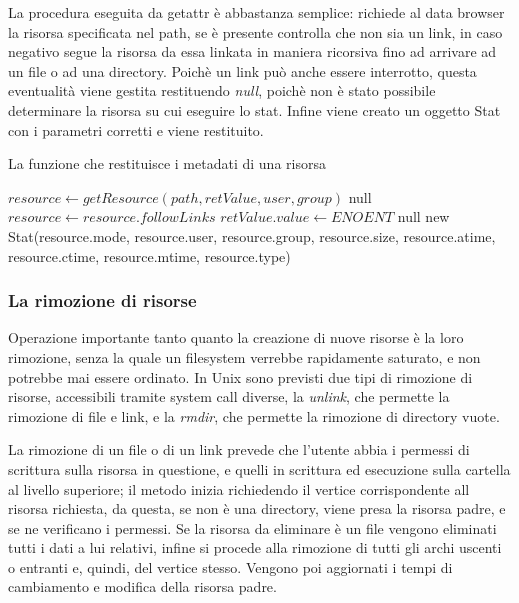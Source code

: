 La procedura eseguita da getattr è abbastanza semplice: richiede al data browser la risorsa specificata nel path, se è presente controlla che non sia un link, in caso negativo segue la risorsa da essa linkata in maniera ricorsiva fino ad arrivare ad un file o ad una directory. Poichè un link può anche essere interrotto, questa eventualità viene gestita restituendo \emph{null}, poichè non è stato possibile determinare la risorsa su cui eseguire lo stat. Infine viene creato un oggetto Stat con i parametri corretti e viene restituito.
\begin{algorithm}
\begin{algorithmic}[5]
\caption{La funzione che restituisce i metadati di una risorsa}
	\State $resource \gets getResource(path, retValue, user, group)$
		\State \Return null
	\EndIf
		\State $resource \gets resource.followLinks$
	\EndIf
		\State $retValue.value \gets ENOENT$
		\State \Return null
	\EndIf
	\State \Return new Stat(resource.mode, resource.user, resource.group, resource.size, resource.atime, resource.ctime, resource.mtime, resource.type)
\EndFunction
\end{algorithmic}
\end{algorithm}

\subsubsection{La rimozione di risorse}
Operazione importante tanto quanto la creazione di nuove risorse è la loro rimozione, senza la quale un filesystem verrebbe rapidamente saturato, e non potrebbe mai essere ordinato. In Unix sono previsti due tipi di rimozione di risorse, accessibili tramite system call diverse, la \emph{unlink}, che permette la rimozione di file e link, e la \emph{rmdir}, che permette la rimozione di directory vuote. 

La rimozione di un file o di un link prevede che l'utente abbia i permessi di scrittura sulla risorsa in questione, e quelli in scrittura ed esecuzione sulla cartella al livello superiore; il metodo inizia richiedendo il vertice corrispondente all risorsa richiesta, da questa, se non è una directory, viene presa la risorsa padre, e se ne verificano i permessi. Se la risorsa da eliminare è un file vengono eliminati tutti i dati a lui relativi, infine si procede alla rimozione di tutti gli archi uscenti o entranti e, quindi, del vertice stesso. Vengono poi aggiornati i tempi di cambiamento e modifica della risorsa padre.

